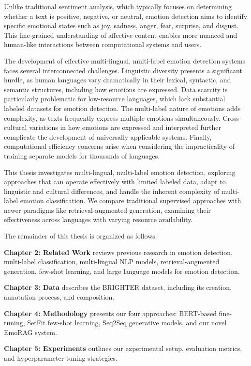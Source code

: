 \documentclass[a4paper,12pt]{extarticle}
\begin{document}
Unlike traditional sentiment analysis, which typically focuses on determining whether a text is positive, negative, or neutral, emotion detection aims to identify specific emotional states such as joy, sadness, anger, fear, surprise, and disgust. This fine-grained understanding of affective content enables more nuanced and human-like interactions between computational systems and users.

The development of effective multi-lingual, multi-label emotion detection systems faces several interconnected challenges. Linguistic diversity presents a significant hurdle, as human languages vary dramatically in their lexical, syntactic, and semantic structures, including how emotions are expressed. Data scarcity is particularly problematic for low-resource languages, which lack substantial labeled datasets for emotion detection. The multi-label nature of emotions adds complexity, as texts frequently express multiple emotions simultaneously. Cross-cultural variations in how emotions are expressed and interpreted further complicate the development of universally applicable systems. Finally, computational efficiency concerns arise when considering the impracticality of training separate models for thousands of languages.

This thesis investigates multi-lingual, multi-label emotion detection, exploring approaches that can operate effectively with limited labeled data, adapt to linguistic and cultural differences, and handle the inherent complexity of multi-label emotion classification. We compare traditional supervised approaches with newer paradigms like retrieval-augmented generation, examining their effectiveness across languages with varying resource availability.

The remainder of this thesis is organized as follows:

\textbf{Chapter 2: Related Work} reviews previous research in emotion detection, multi-label classification, multi-lingual NLP models, retrieval-augmented generation, few-shot learning, and large language models for emotion detection.

\textbf{Chapter 3: Data} describes the BRIGHTER dataset, including its creation, annotation process, and composition.

\textbf{Chapter 4: Methodology} presents our four approaches: BERT-based fine-tuning, SetFit few-shot learning, Seq2Seq generative models, and our novel EmoRAG system.

\textbf{Chapter 5: Experiments} outlines our experimental setup, evaluation metrics, and hyperparameter tuning strategies.
\end{document}
